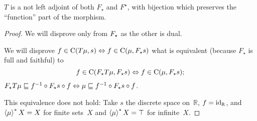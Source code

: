 
\begin{example}
  $T$ is a not left adjoint of both $F_{\star}$ and $F^{\star}$, with bijection
  which preserves the ``function'' part of the morphism.
\end{example}

\begin{proof}
  We will disprove only from $F_{\star}$ as the other is dual.
  
  We will disprove $f \in \mathrm{C} (T \mu, s) \Leftrightarrow f \in \mathrm{C}
  (\mu, F_{\star} s)$ what is equivalent
  (because $F_{\star}$ is full and faithful) to
  \[ f \in \mathrm{C} (F_{\star} T \mu, F_{\star} s) \Leftrightarrow f \in
     \mathrm{C} (\mu, F_{\star} s) ; \]
  $F_{\star} T \mu \sqsubseteq f^{- 1} \circ F_{\star} s \circ f
  \Leftrightarrow \mu \sqsubseteq f^{- 1} \circ F_{\star} s \circ f$.
  
  This equivalence does not hold: Take $s$ the discrete space
  on~$\mathbb{R}$, $f=\operatorname{id}_{\mathbb{R}}$, and
  $\left\langle \mu\right\rangle ^{\ast}X=X$ for finite sets~$X$ and $\left\langle \mu\right\rangle ^{\ast}X=\top$
  for infinite~$X$.
\end{proof}
